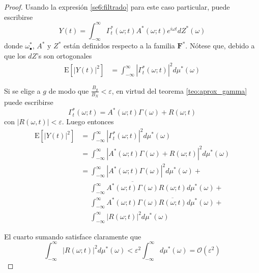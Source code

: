 \documentclass[12pt,letterpaper]{book}
\newcommand{\intR}{\int_{-\infty}^{\infty}}
\newcommand{\ef}{\mathbf{F}}
\newcommand{\efstar}{\ef^{\boldsymbol{*}}}
\newcommand{\E}[1]{\mathrm{E}\left[ #1 \right]}
\newcommand{\abso}[1]{\left| #1 \right|}
\newcommand{\orden}[1]{\mathcal{O}\left( #1 \right)}
\newcommand{\pheq}{\phantom{=}}
\begin{document}
\begin{proof}
Usando la expresión \ref{se6:filtrado} para este caso particular, puede escribirse
\begin{equation}
Y(t) = \intR \Gamma_t^{*} (\omega; t) A^{*}(\omega; t) e^{i \omega t} dZ^{*}(\omega)
\end{equation}
donde $\omega_\bullet^{*}$, $A^{*}$ y $Z^{*}$ están definidos respecto a la familia $\efstar$.
Nótese que, debido a que los $dZ$'s son ortogonales
\begin{align*}
\E{\abso{Y(t)}^{2}} 
&= \intR \abso{\Gamma_t^{*} (\omega; t)}^{2} d\mu^{*}(\omega)
\end{align*}

Si se elige a $g$ de modo que $\frac{B_g}{B_X} < \varepsilon$, en virtud del teorema \ref{teo:aprox_gamma} puede escribirse
\begin{equation}
\Gamma_t^{*}(\omega; t) = A^{*}(\omega; t) \Gamma(\omega) + R(\omega; t)
\end{equation}
con $\abso{R(\omega,t)} < \varepsilon$. Luego entonces
\begin{align*}
\E{\abso{Y(t)}^{2}} 
&= 
\intR \abso{\Gamma_t^{*} (\omega; t)}^{2} d\mu^{*}(\omega) \\
&= 
\intR \abso{A^{*}(\omega; t) \Gamma(\omega) + R(\omega; t)}^{2} d\mu^{*}(\omega) \\
&= 
\intR \abso{A^{*}(\omega; t) \Gamma(\omega)}^{2} d\mu^{*}(\omega) +\\
&\pheq
\intR \overline{A^{*}(\omega; t) \Gamma(\omega)} R(\omega; t) d\mu^{*}(\omega) +\\
&\pheq
\intR A^{*}(\omega; t) \Gamma(\omega) \overline{ R(\omega; t)} d\mu^{*}(\omega) +\\
&\pheq
\intR \abso{R(\omega; t)}^{2} d\mu^{*}(\omega) 
\end{align*}

El cuarto sumando satisface claramente que
\begin{equation}
\intR \abso{R(\omega; t)}^{2} d\mu^{*}(\omega)  < \varepsilon^{2} \intR d\mu^{*}(\omega) 
= \orden{\varepsilon^{2}}
\end{equation}


\end{proof}
\end{document}
